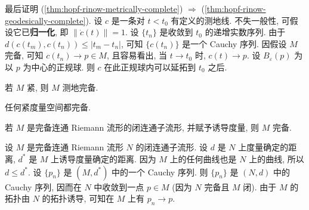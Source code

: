 \begin{RiemannProof}
最后证明 (\ref{thm:hopf-rinow-metrically-complete}) $\Rightarrow$ (\ref{thm:hopf-rinow-geodesically-complete}). 设 $c$ 是一条对 $t<t_0$ 有定义的测地线. 不失一般性, 可假设它已\textbf{归一化}, 即 $\lVert\dot c(t)\rVert=1$. 设 $\{t_n\}$ 是收敛到 $t_0$ 的递增实数序列. 由于 $d(c(t_m),c(t_n))\leq|t_m-t_n|$, 可知 $\{c(t_n)\}$ 是一个 Cauchy 序列. 因假设 $M$ 完备, 可知 $c(t_n)\to p\in M$, 且容易看出, 当 $t\to t_0$ 时, $c(t)\to p$. 设 $B_\varepsilon(p)$ 为以 $p$ 为中心的正规球. 则 $c$ 在此正规球内可以延拓到 $t_0$ 之后.
\end{RiemannProof}

\begin{RiemannCorollary}\label{cor:compact-riemannian-manifold-geodesically-complete}
若 $M$ 紧, 则 $M$ 测地完备.
\end{RiemannCorollary}

\begin{RiemannProof}
任何紧度量空间都完备.
\end{RiemannProof}

\begin{RiemannCorollary}\label{cor:closed-submanifold-complete-in-induced-metric}
若 $M$ 是完备连通 Riemann 流形的闭连通子流形, 并赋予诱导度量, 则 $M$ 完备.
\end{RiemannCorollary}

\begin{RiemannProof}
设 $M$ 是完备连通 Riemann 流形 $N$ 的闭连通子流形. 设 $d$ 是 $N$ 上度量确定的距离, $d^*$ 是 $M$ 上诱导度量确定的距离. 因为 $M$ 上的任何曲线也是 $N$ 上的曲线, 所以 $d\leq d^*$. 设 $\{p_n\}$ 是 $(M,d^*)$ 中的一个 Cauchy 序列. 则 $\{p_n\}$ 是 $(N,d)$ 中的 Cauchy 序列, 因而在 $N$ 中收敛到一点 $p\in M$ (因为 $N$ 完备且 $M$ 闭). 由于 $M$ 的拓扑由 $N$ 的拓扑诱导, 可知在 $M$ 上有 $p_n\to p$.
\end{RiemannProof}

